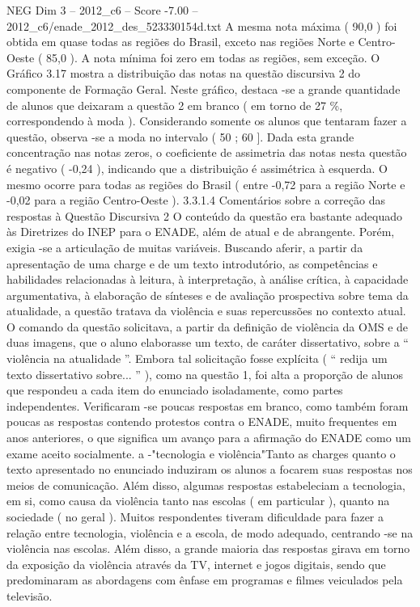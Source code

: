 \begin{textsample}{NEG Dim 3 – 2012\_c6 – Score -7.00 – 2012\_c6/enade\_2012\_des\_523330154d.txt}
A mesma nota máxima ( 90,0 ) foi obtida em quase todas as regiões do Brasil, exceto nas regiões Norte e Centro-Oeste ( 85,0 ).
A nota mínima foi zero em todas as regiões, sem exceção.
O Gráfico 3.17 mostra a distribuição das notas na questão discursiva 2 do componente de Formação Geral.
Neste gráfico, destaca -se a grande quantidade de alunos que deixaram a questão 2 em branco ( em torno de 27 \%, correspondendo à moda ).
Considerando somente os alunos que tentaram fazer a questão, observa -se a moda no intervalo ( 50 ; 60 ].
Dada esta grande concentração nas notas zeros, o coeficiente de assimetria das notas nesta questão é negativo ( -0,24 ), indicando que a distribuição é assimétrica à esquerda.
O mesmo ocorre para todas as regiões do Brasil ( entre -0,72 para a região Norte e -0,02 para a região Centro-Oeste ). 3.3.1.4 Comentários sobre a correção das respostas à Questão Discursiva 2 O conteúdo da questão era bastante adequado às Diretrizes do INEP para o ENADE, além de atual e de abrangente.
Porém, exigia -se a articulação de muitas variáveis.
Buscando aferir, a partir da apresentação de uma charge e de um texto introdutório, as competências e habilidades relacionadas à leitura, à interpretação, à análise crítica, à capacidade argumentativa, à elaboração de sínteses e de avaliação prospectiva sobre tema da atualidade, a questão tratava da violência e suas repercussões no contexto atual.
O comando da questão solicitava, a partir da definição de violência da OMS e de duas imagens, que o aluno elaborasse um texto, de caráter dissertativo, sobre a “ violência na atualidade ”.
Embora tal solicitação fosse explícita ( “ redija um texto dissertativo sobre... ” ), como na questão 1, foi alta a proporção de alunos que respondeu a cada item do enunciado isoladamente, como partes independentes.
Verificaram -se poucas respostas em branco, como também foram poucas as respostas contendo protestos contra o ENADE, muito frequentes em anos anteriores, o que significa um avanço para a afirmação do ENADE como um exame aceito socialmente. a -"tecnologia e violência"Tanto as charges quanto o texto apresentado no enunciado induziram os alunos a focarem suas respostas nos meios de comunicação.
Além disso, algumas respostas estabeleciam a tecnologia, em si, como causa da violência tanto nas escolas ( em particular ), quanto na sociedade ( no geral ).
Muitos respondentes tiveram dificuldade para fazer a relação entre tecnologia, violência e a escola, de modo adequado, centrando -se na violência nas escolas.
Além disso, a grande maioria das respostas girava em torno da exposição da violência através da TV, internet e jogos digitais, sendo que predominaram as abordagens com ênfase em programas e filmes veiculados pela televisão.

\end{textsample}
